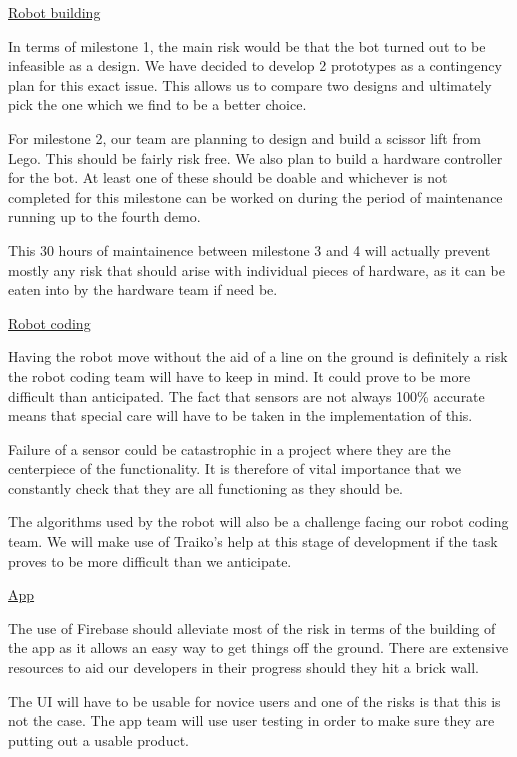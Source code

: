 \documentclass{article}
\begin{document}
\underline{Robot building}

In terms of milestone 1, the main risk would be that the bot turned out to be infeasible as a design. We have decided to develop 2 prototypes as a contingency plan for this exact issue. This allows us to compare two designs and ultimately pick the one which we find to be a better choice.

For milestone 2, our team are planning to design and build a scissor lift from Lego. This should be fairly risk free. We also plan to build a hardware controller for the bot. At least one of these should be doable and whichever is not completed for this milestone can be worked on during the period of maintenance running up to the fourth demo.

This 30 hours of maintainence between milestone 3 and 4 will actually prevent mostly any risk that should arise with individual pieces of hardware, as it can be eaten into by the hardware team if need be.

\underline{Robot coding}

Having the robot move without the aid of a line on the ground is definitely a risk the robot coding team will have to keep in mind. It could prove to be more difficult than anticipated. The fact that sensors are not always 100\% accurate means that special care will have to be taken in the implementation of this.

Failure of a sensor could be catastrophic in a project where they are the centerpiece of the functionality. It is therefore of vital importance that we constantly check that they are all functioning as they should be.

The algorithms used by the robot will also be a challenge facing our robot coding team. We will make use of Traiko's help at this stage of development if the task proves to be more difficult than we anticipate.

\underline{App}

The use of Firebase should alleviate most of the risk in terms of the building of the app as it allows an easy way to get things off the ground. There are extensive resources to aid our developers in their progress should they hit a brick wall.

The UI will have to be usable for novice users and one of the risks is that this is not the case. The app team will use user testing in order to make sure they are putting out a usable product.
\end{document}

